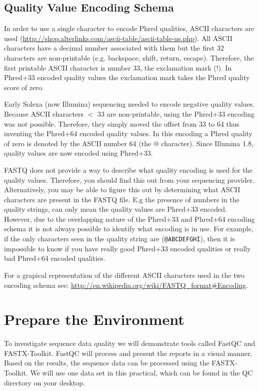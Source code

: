\subsection{Quality Value Encoding Schema}

In order to use a single character to encode Phred qualities, ASCII characters
are used (\url{http://shop.alterlinks.com/ascii-table/ascii-table-us.php}). All ASCII characters have a decimal
number associated with them but the first 32 characters are non-printable (e.g.
backspace, shift, return, escape). Therefore, the first printable ASCII
character is number 33, the exclamation mark (!). In Phred+33 encoded quality
values the exclamation mark takes the Phred quality score of zero.

Early Solexa (now Illumina) sequencing needed to encode negative quality values.
Because ASCII characters $<$ 33 are non-printable, using the Phred+33 encoding was
not possible. Therefore, they simply moved the offset from 33 to 64 thus
inventing the Phred+64 encoded quality values. In this encoding a Phred quality
of zero is denoted by the ASCII number 64 (the @ character). Since Illumina 1.8,
quality values are now encoded using Phred+33.

FASTQ does not provide a way to describe what quality encoding is used for the
quality values. Therefore, you should find this out from your sequencing
provider. Alternatively, you may be able to figure this out by determining what
ASCII characters are present in the FASTQ file. E.g the presence of numbers in
the quality strings, can only mean the quality values are Phred+33 encoded.
However, due to the overlapping nature of the Phred+33 and Phred+64 encoding
schema it is not always possible to identify what encoding is in use. For
example, if the only characters seen in the quality string are (\texttt{@ABCDEFGHI}),
then it is impossible to know if you have really good Phred+33 encoded qualities
or really bad Phred+64 encoded qualities.

For a grapical representation of the different ASCII characters used in the two
encoding schema see: \url{http://en.wikipedia.org/wiki/FASTQ_format#Encoding}.

\section{Prepare the Environment}

\begin{information}
To investigate sequence data quality we will demonstrate tools called FastQC
and FASTX-Toolkit. FastQC will process and present the reports in a visual manner.
Based on the results, the sequence data can be processed using the FASTX-Toolkit.
We will use one data set in this practical, which can be found in the QC
directory on your desktop.
\end{information}

